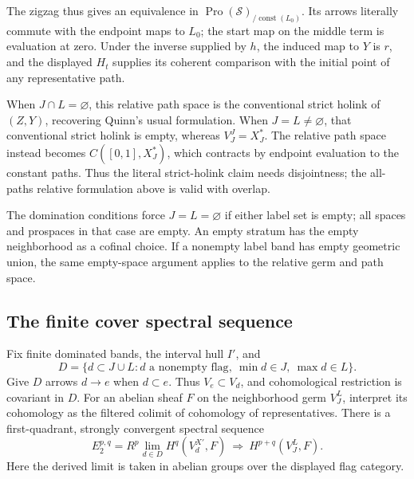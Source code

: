 \documentclass[11pt,a4paper]{article}
\theoremstyle{definition}
\begin{document}
The zigzag thus gives an equivalence in $\operatorname{Pro}(\mathcal S)_{/\operatorname{const}(L_0)}$. Its arrows literally commute with the endpoint maps to \(L_0\); the start map on the middle term is evaluation at zero. Under the inverse supplied by \(h\), the induced map to \(Y\) is \(r\), and the displayed \(H_t\) supplies its coherent comparison with the initial point of any representative path.

When \(J\cap L=\varnothing\), this relative path space is the conventional strict holink of \((Z,Y)\), recovering Quinn's usual formulation. When \(J=L\ne\varnothing\), that conventional strict holink is empty, whereas \(V_J^J=X_J^*\). The relative path space instead becomes \(C([0,1],X_J^*)\), which contracts by endpoint evaluation to the constant paths. Thus the literal strict-holink claim needs disjointness; the all-paths relative formulation above is valid with overlap.

The domination conditions force $J=L=\varnothing$ if either label set
is empty; all spaces and prospaces in that case are empty. An empty
stratum has the empty neighborhood as a cofinal choice. If a nonempty
label band has empty geometric union, the same empty-space argument
applies to the relative germ and path space.

\subsection{The finite cover spectral sequence}\label{c4.03-proved-the-finite-cover-spectral-sequence}

Fix finite dominated bands, the interval hull \(I'\), and \[
 D=\{d\subset J\cup L:d\text{ a nonempty flag},\
             \min d\in J,\ \max d\in L\}.
\] Give \(D\) arrows \(d\to e\) when \(d\subset e\). Thus \(V_e\subset V_d\), and cohomological restriction is covariant in \(D\). For an abelian sheaf \(F\) on the neighborhood germ \(V_J^L\), interpret its cohomology as the filtered colimit of cohomology of representatives. There is a first-quadrant, strongly convergent spectral sequence \[
 E_2^{p,q}=R^p\!\lim_{d\in D}H^q(V_d^{X'},F)
 \ \Longrightarrow\ H^{p+q}(V_J^L,F).
\] Here the derived limit is taken in abelian groups over the displayed flag category.
\end{document}
